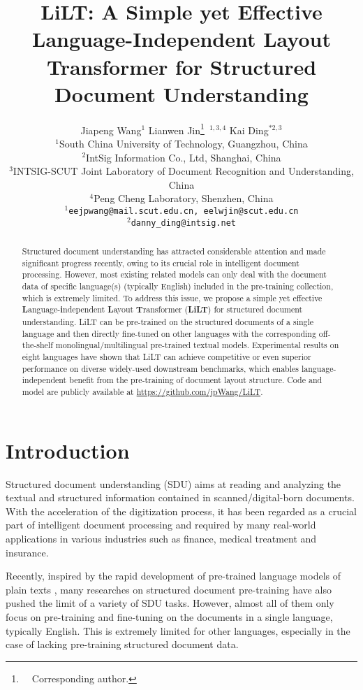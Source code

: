 \documentclass[11pt]{article}
\title{LiLT: A Simple yet Effective Language-Independent Layout Transformer for Structured Document Understanding}
\author{Jiapeng Wang$^1$ \qquad  Lianwen Jin\thanks{\ \ Corresponding author.}\ $^{1,3,4}$  \qquad  Kai Ding$^{*2,3}$ \\
$^1$South China University of Technology, Guangzhou, China\\
$^2$IntSig Information Co.,  Ltd, Shanghai, China\\
$^3$INTSIG-SCUT Joint Laboratory of Document Recognition and Understanding, China\\
$^4$Peng Cheng Laboratory, Shenzhen, China\\
$^{1}$\texttt{eejpwang@mail.scut.edu.cn,  eelwjin@scut.edu.cn} \\
$^{2}$\texttt{danny\_ding@intsig.net}\\
}
\begin{document}
\maketitle
\begin{abstract}
Structured document understanding has attracted considerable attention and made significant progress recently, owing to its crucial role in intelligent document  processing. However, most existing related models can only  deal with the  document data of specific language(s)  (typically English) included in the pre-training collection,  which is extremely limited. To address this issue, we propose a simple yet effective \textbf{L}anguage-\textbf{i}ndependent \textbf{L}ayout \textbf{T}ransformer (\textbf{LiLT}) for structured 
document understanding. LiLT can be pre-trained on the structured documents of a single language and  then directly fine-tuned on other  languages with the corresponding off-the-shelf monolingual/multilingual pre-trained textual models. Experimental results on eight languages have shown that LiLT  can achieve  competitive or even superior performance on diverse widely-used downstream benchmarks, which enables language-independent benefit from the pre-training of document layout structure. Code and model 
are publicly available at  \href{https://github.com/jpWang/LiLT}{https://github.com/jpWang/LiLT}.
\end{abstract}


\section{Introduction}
Structured document understanding (SDU) aims at reading and analyzing the textual and structured information contained in scanned/digital-born documents. 
With the acceleration of the digitization process, it has been regarded as a crucial part of  intelligent document  processing and required by many real-world  applications in various industries such as finance, medical treatment and  insurance.

Recently, inspired by the rapid development of pre-trained language
models of plain texts \cite{devlin2019bert,liu2019roberta,bao2020unilmv2,chi2021infoxlm},
 many researches  on structured document  pre-training \cite{Layoutlm,layoutlmv2,xu2021layoutxlm,li2021structurallm,li2021selfdoc,li2021structext,appalaraju2021docformer}  have also pushed the limit of a variety of SDU tasks.
However, almost  all of them only focus on pre-training and fine-tuning on the documents in a single language, typically English. This is extremely limited for  other languages, especially in the case of lacking pre-training structured document data.
\end{document}
